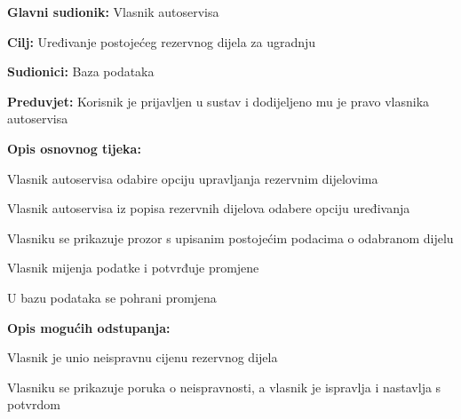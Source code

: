 \noindent {}
\begin{packed_item}
	
	\item \textbf{Glavni sudionik: } Vlasnik autoservisa
	\item  \textbf{Cilj:} Uređivanje postojećeg rezervnog dijela za ugradnju
	\item  \textbf{Sudionici:} Baza podataka
	\item  \textbf{Preduvjet:} Korisnik je prijavljen u sustav i dodijeljeno
	mu je pravo vlasnika autoservisa
	\item  \textbf{Opis osnovnog tijeka:}
	
	\item[] \begin{packed_enum}
		
		\item Vlasnik autoservisa odabire opciju upravljanja rezervnim dijelovima
		\item Vlasnik autoservisa iz popisa rezervnih dijelova odabere opciju
		uređivanja
		\item Vlasniku se prikazuje prozor s upisanim postojećim podacima o
		odabranom dijelu
		\item Vlasnik mijenja podatke i potvrđuje promjene
		\item U bazu podataka se pohrani promjena
		
	\end{packed_enum}
	
	\item  \textbf{Opis mogućih odstupanja:}
	\item[] \begin{packed_item}
		\item[4.a] Vlasnik je unio neispravnu cijenu rezervnog dijela
		\item[] \begin{packed_enum}
			\item Vlasniku se prikazuje poruka o neispravnosti, a vlasnik je
			ispravlja i nastavlja s potvrdom
		\end{packed_enum}
	\end{packed_item}
	
\end{packed_item}


